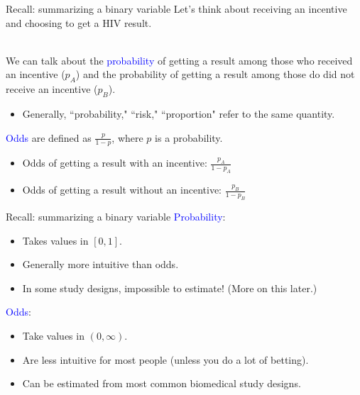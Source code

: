\documentclass[10pt,t]{beamer}
\begin{document}
\begin{frame}{Recall: summarizing a binary variable}
	Let's think about receiving an incentive and choosing to get a HIV result. 
	\\ ~\ 
	
	We can talk about the \textcolor{blue}{probability} of getting a result among those who received an incentive ($p_A$) and the probability of getting a result among those do did not receive an incentive ($p_B$).
	\medskip
	
	\begin{itemize}
		\item Generally, ``probability," ``risk," ``proportion" refer to the same quantity.
		
		\medskip
	\end{itemize}  

	\textcolor{blue}{Odds} are defined as $\frac{p}{1-p}$, where $p$ is a probability.
	\medskip
	
	\begin{itemize}
		\item Odds of getting a result with an incentive: $\frac{p_A}{1-p_A}$
		
		\medskip
		
		\item Odds of getting a result without an incentive: $\frac{p_B}{1-p_B}$
	\end{itemize}
\end{frame}

\begin{frame}{Recall: summarizing a binary variable}
\textcolor{blue}{Probability}:
\medskip

\begin{itemize}
	\item Takes values in $[0,1]$.
	\medskip
	
	\item Generally more intuitive than odds. 
	\medskip
	
	\item In some study designs, impossible to estimate! (More on this later.)
\end{itemize}   
\medskip

\textcolor{blue}{Odds}:
\medskip
\begin{itemize}
	\item Take values in $(0,\infty)$.
	\medskip
	
	\item Are less intuitive for most people (unless you do a lot of betting).
	\medskip
	
	\item Can be estimated from most common biomedical study designs. 
\end{itemize}
\end{frame}
\end{document}
